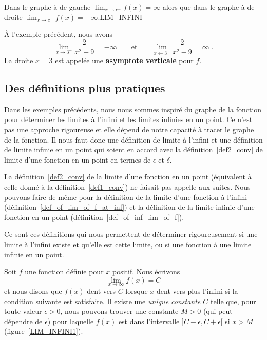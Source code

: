 {
{Dans le graphe à de gauche
$\displaystyle \lim_{x\rightarrow c^-} f(x) = \infty$
alors que dans le graphe à de droite 
$\displaystyle \lim_{x\rightarrow c^+} f(x) = -\infty$.}{LIM_INFINI}

\begin{egg}
À l'exemple précédent, nous avons
\[
\lim_{x\rightarrow 3^-} \frac{2}{x^2-9} = -\infty \qquad
\text{et} \qquad 
\lim_{x\leftarrow 3^+} \frac{2}{x^2-9} = \infty \; .
\]
La droite $x=3$ est appelée une {\bfseries asymptote verticale} pour $f$.
\end{egg}

\subsection{Des définitions plus pratiques \theory}

Dans les exemples précédents, nous nous sommes inspiré du graphe de la
fonction pour déterminer les limites à l'infini et les limites
infinies en un point.  Ce n'est pas une approche rigoureuse et elle
dépend de notre capacité à tracer le graphe de la fonction.  Il nous
faut donc une définition de limite à l'infini et une définition de
limite infinie en un point qui soient en accord avec la
définition~\ref{def2_conv} de limite d'une fonction en un point en
termes de $\epsilon$ et $\delta$.

La définition~\ref{def2_conv} de la limite d'une fonction en un point
(équivalent à celle donné à la définition~\ref{def1_conv}) ne faisait
pas appelle aux suites.  Nous pouvons faire de même pour la définition de la
limite d'une fonction à l'infini
(définition~\ref{def_of_lim_of_f_at_inf}) et la définition de la limite
infinie d'une fonction en un point (définition~\ref{def_of_inf_lim_of_f}).

Ce sont ces définitions qui nous permettent de déterminer
rigoureusement si une limite à l'infini existe et qu'elle est cette
limite, ou si une fonction à une limite infinie en un point.

\begin{focus}{\dfn} 
Soit $f$ une fonction définie pour $x$ positif.  Nous écrivons
\[
\lim_{x\rightarrow \infty} f(x) = C
\]
et nous disons que $f(x)$ dent vers $C$ lorsque $x$ dent vers plus l'infini
si la condition suivante est satisfaite.  Il existe une
{\em unique constante $C$} telle que, pour toute valeur $\epsilon>0$,
nous pouvons trouver une constante $M>0$ (qui peut dépendre de $\epsilon$)
pour laquelle $f(x)$ est dans l'intervalle $]C-\epsilon,C+\epsilon[$
si $x>M$ (figure~\ref{LIM_INFINI1}).


\end{focus}}
